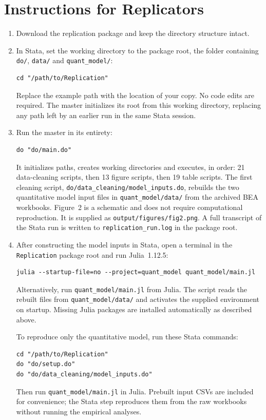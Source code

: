 \documentclass[11pt]{article}
\newcommand{\pkgfile}[1]{\nolinkurl{#1}}
\begin{document}
\section{Instructions for Replicators}

\begin{enumerate}
\item Download the replication package and keep the directory structure intact.

\item In Stata, set the working directory to the package root, the folder
  containing \pkgfile{do/}, \pkgfile{data/} and \pkgfile{quant_model/}:
\begin{Verbatim}
cd "/path/to/Replication"
\end{Verbatim}
  Replace the example path with the location of your copy. No code edits
  are required. The master initializes its root from this working directory,
  replacing any path left by an earlier run in the same Stata session.

\item Run the master in its entirety:
\begin{Verbatim}
do "do/main.do"
\end{Verbatim}
  It initializes paths, creates working directories and executes, in order:
  21 data-cleaning scripts, then 13 figure scripts, then 19 table scripts.
  The first cleaning script, \pkgfile{do/data_cleaning/model_inputs.do},
  rebuilds the two quantitative model input files in
  \pkgfile{quant_model/data/} from the archived BEA workbooks.
  Figure~2 is a schematic and does not require computational reproduction.
  It is supplied as \pkgfile{output/figures/fig2.png}.
  A full transcript of the Stata run is written
  to \pkgfile{replication_run.log} in the package root.

\item After constructing the model inputs in Stata, open a terminal in
  the \pkgfile{Replication} package root and run Julia~1.12.5:
\begin{Verbatim}[fontsize=\small]
julia --startup-file=no --project=quant_model quant_model/main.jl
\end{Verbatim}
  Alternatively, run \pkgfile{quant_model/main.jl} from Julia. The script
  reads the rebuilt files from \pkgfile{quant_model/data/} and activates
  the supplied environment on startup. Missing Julia packages are
  installed automatically as described above.

  To reproduce only the quantitative model, run these Stata commands:
\begin{Verbatim}
cd "/path/to/Replication"
do "do/setup.do"
do "do/data_cleaning/model_inputs.do"
\end{Verbatim}
  Then run \pkgfile{quant_model/main.jl} in Julia. Prebuilt input CSVs are
  included for convenience; the Stata step reproduces them from the raw
  workbooks without running the empirical analyses.
\end{enumerate}
\end{document}

